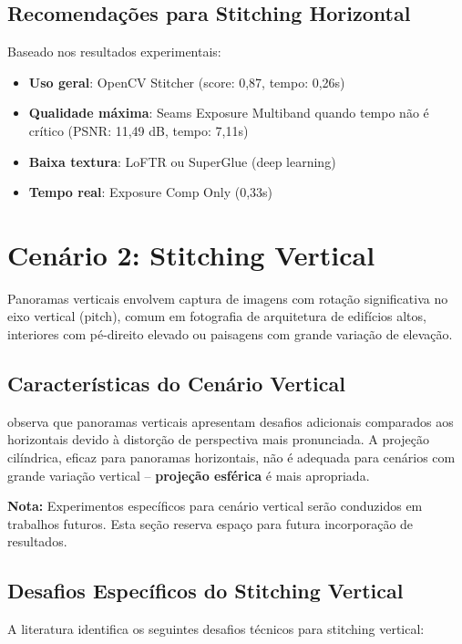 \subsection{Recomendações para Stitching Horizontal}

Baseado nos resultados experimentais:

\begin{itemize}
    \item \textbf{Uso geral}: OpenCV Stitcher (score: 0,87, tempo: 0,26s)
    \item \textbf{Qualidade máxima}: Seams Exposure Multiband quando tempo não é crítico (PSNR: 11,49 dB, tempo: 7,11s)
    \item \textbf{Baixa textura}: LoFTR ou SuperGlue (deep learning)
    \item \textbf{Tempo real}: Exposure Comp Only (0,33s)
\end{itemize}

\section{Cenário 2: Stitching Vertical}
\label{sec:vertical}

Panoramas verticais envolvem captura de imagens com rotação significativa no eixo vertical (pitch), comum em fotografia de arquitetura de edifícios altos, interiores com pé-direito elevado ou paisagens com grande variação de elevação.

\subsection{Características do Cenário Vertical}

\cite{Brown2007} observa que panoramas verticais apresentam desafios adicionais comparados aos horizontais devido à distorção de perspectiva mais pronunciada. A projeção cilíndrica, eficaz para panoramas horizontais, não é adequada para cenários com grande variação vertical -- \textbf{projeção esférica} é mais apropriada.

\textbf{Nota:} Experimentos específicos para cenário vertical serão conduzidos em trabalhos futuros. Esta seção reserva espaço para futura incorporação de resultados.

\subsection{Desafios Específicos do Stitching Vertical}

A literatura identifica os seguintes desafios técnicos para stitching vertical:

